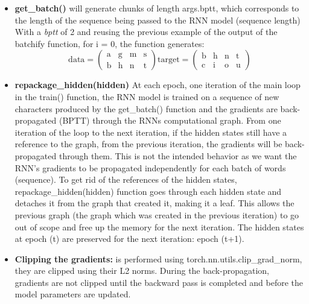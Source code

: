 \documentclass[11pt]{article}
\newcommand{\0}{\mat{0}}
\begin{document}
\begin{itemize}
\begin{itemize}
	\item \textbf{get\_batch()} will  generate chunks of length args.bptt, which corresponds to the length of the sequence being passed to the RNN model (sequence length) 
	With a \textit{bptt} of 2 and reusing the previous example of the output of the batchify function, for i = 0, the function generates: 
	\[ \text{data}=\left(  \begin{array}{cccc}
			\text{a} &  \text{g} & \text{m} & \text{s}  \\
			\text{b}  &  \text{h} & \text{n} & \text{t}
		   \end{array} \right)
	 \text{target}=\left(\begin{array}{cccc}
			 \text{b}  &  \text{h} & \text{n} & \text{t} \\
			\text{c}  &  \text{i} & \text{o} & \text{u}
		\end{array} \right)
	\]
	
	\item \textbf{repackage\_hidden(hidden)}  At each epoch, one iteration of the main loop in the train() function, the RNN model is trained on a sequence of new characters produced by the  get\_batch() function and the gradients are back-propagated (BPTT) through the RNNs computational graph. From one iteration of the loop to the next iteration, if the hidden states still have a reference to the graph, from the previous iteration, the gradients will be back-propagated through them. This is not the intended behavior as we want the RNN's gradients to be propagated independently for each batch of words (sequence). To get rid of the references of the hidden states, repackage\_hidden(hidden) function  goes through each hidden state and detaches it from the graph that created it, making it a leaf. This allows the previous graph (the graph which was created in the previous iteration) to go out of scope and free up the memory for the next iteration. The hidden states at epoch (t)  are preserved for the next iteration: epoch (t+1).
	
	\item \textbf{Clipping the gradients:} is performed using  torch.nn.utils.clip\_grad\_norm, they are clipped using their L2 norms. During the back-propagation, gradients are not clipped until the backward pass is completed and before the model parameters are updated.
	\end{itemize}
		   
         \begin{center}
         \begin{tikzpicture}[node distance = 2cm, auto]
        

\end{tikzpicture}
\end{center}
\end{itemize}
\end{document}
